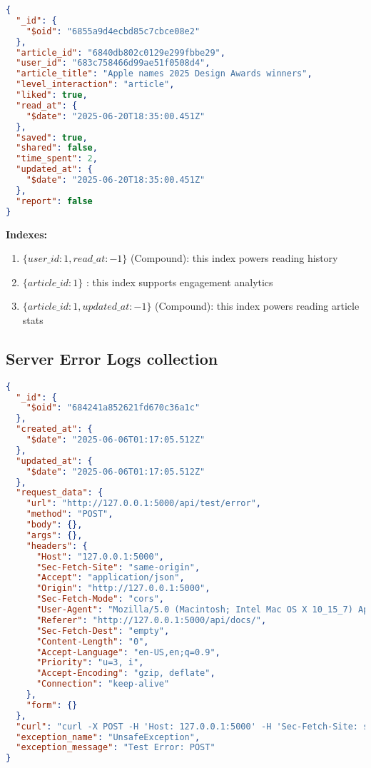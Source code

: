 \begin{lstlisting}[language=json,label={lst:articles-users-interactions-collection-json-example}]
{
  "_id": {
    "$oid": "6855a9d4ecbd85c7cbce08e2"
  },
  "article_id": "6840db802c0129e299fbbe29",
  "user_id": "683c758466d99ae51f0508d4",
  "article_title": "Apple names 2025 Design Awards winners",
  "level_interaction": "article",
  "liked": true,
  "read_at": {
    "$date": "2025-06-20T18:35:00.451Z"
  },
  "saved": true,
  "shared": false,
  "time_spent": 2,
  "updated_at": {
    "$date": "2025-06-20T18:35:00.451Z"
  },
  "report": false
}
\end{lstlisting}

\textbf{Indexes:}

\begin{enumerate}
  \item $\{ user\_id: 1,  read\_at: -1\}$ (Compound): this index powers reading history
  \item $\{ article\_id: 1 \}$ : this index supports engagement analytics
  \item $\{ article\_id: 1,  updated\_at: -1\}$ (Compound): this index powers reading article stats
\end{enumerate}

\subsection{Server Error Logs collection}\label{subsec:server-error-logs-collection}

\begin{lstlisting}[language=json,label={lst:server-logs-collection-json-example}]
{
  "_id": {
    "$oid": "684241a852621fd670c36a1c"
  },
  "created_at": {
    "$date": "2025-06-06T01:17:05.512Z"
  },
  "updated_at": {
    "$date": "2025-06-06T01:17:05.512Z"
  },
  "request_data": {
    "url": "http://127.0.0.1:5000/api/test/error",
    "method": "POST",
    "body": {},
    "args": {},
    "headers": {
      "Host": "127.0.0.1:5000",
      "Sec-Fetch-Site": "same-origin",
      "Accept": "application/json",
      "Origin": "http://127.0.0.1:5000",
      "Sec-Fetch-Mode": "cors",
      "User-Agent": "Mozilla/5.0 (Macintosh; Intel Mac OS X 10_15_7) AppleWebKit/605.1.15 (KHTML, like Gecko) Version/18.5 Safari/605.1.15",
      "Referer": "http://127.0.0.1:5000/api/docs/",
      "Sec-Fetch-Dest": "empty",
      "Content-Length": "0",
      "Accept-Language": "en-US,en;q=0.9",
      "Priority": "u=3, i",
      "Accept-Encoding": "gzip, deflate",
      "Connection": "keep-alive"
    },
    "form": {}
  },
  "curl": "curl -X POST -H 'Host: 127.0.0.1:5000' -H 'Sec-Fetch-Site: same-origin' -H 'Accept: application/json' -H 'Origin: http://127.0.0.1:5000' -H 'Sec-Fetch-Mode: cors' -H 'User-Agent: Mozilla/5.0 (Macintosh; Intel Mac OS X 10_15_7) AppleWebKit/605.1.15 (KHTML, like Gecko) Version/18.5 Safari/605.1.15' -H 'Referer: http://127.0.0.1:5000/api/docs/' -H 'Sec-Fetch-Dest: empty' -H 'Accept-Language: en-US,en;q=0.9' -H 'Priority: u=3, i' -H 'Accept-Encoding: gzip, deflate' -H 'Connection: keep-alive'  'http://127.0.0.1:5000/api/test/error'",
  "exception_name": "UnsafeException",
  "exception_message": "Test Error: POST"
}
\end{lstlisting}

